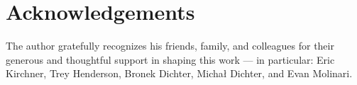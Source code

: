 \documentclass[twocolumn,10pt]{asme2ej}
\newcommand{\id}{\hspace{6 mm}}
\begin{document}
%

\section{Acknowledgements}

The author gratefully recognizes his friends, family, and colleagues for their generous and thoughtful support in shaping this work --- in particular: Eric Kirchner, Trey Henderson, Bronek Dichter, Michał Dichter, and Evan Molinari.

\end{document}
